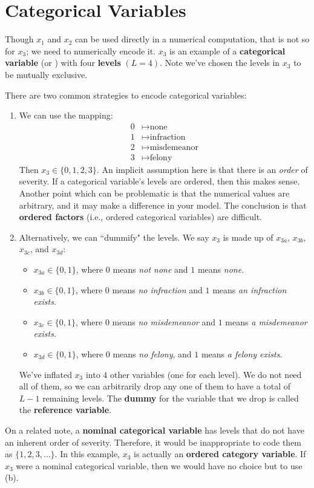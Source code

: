 \documentclass[12pt, a4paper]{article}
\begin{document}
	\section*{Categorical Variables}
	Though $x_1$ and $x_2$ can be used directly in a numerical computation, that is not so
	for $x_3$; we need to numerically encode it. $x_3$ is an example of a \textbf{categorical variable}
	(or ) with four \textbf{levels} $(L = 4)$. Note we've chosen the levels in $x_3$ to
	be mutually exclusive.
	
	There are two common strategies to encode categorical variables:
	\begin{enumerate}[label=(\alph*)]
		\item We can use the mapping:
		\begin{align*}
			0&\mapsto \text{none}\\
			1&\mapsto \text{infraction}\\
			2&\mapsto \text{misdemeanor}\\
			3&\mapsto \text{felony}
		\end{align*}
	Then $x_3\in\{0,1,2,3\}$. An implicit assumption here is that there is an \emph{order}
	of severity. If a categorical variable's levels are ordered, then this makes sense.
	Another point which can be problematic is that the numerical values are arbitrary, and
	it may make a difference in your model. The conclusion is that \textbf{ordered factors}
	(i.e., ordered categorical variables) are difficult.
	\item Alternatively, we can ``dummify" the levels. We say $x_3$ is made up of
	$x_{3a}$, $x_{3b}$, $x_{3c}$, and $x_{3d}$:
	\begin{itemize}
		\item $x_{3a}\in \{0, 1\}$, where $0$ means \textit{not none} and $1$ means \textit{none}.
		\item $x_{3b}\in \{0, 1\}$, where $0$ means \textit{no infraction} and $1$ means
		\textit{an infraction exists}.
		\item $x_{3c}\in \{0, 1\}$, where $0$ means \textit{no misdemeanor} and $1$ means
		\textit{a misdemeanor exists}.
		\item $x_{3d}\in \{0, 1\}$, where $0$ means \textit{no felony}, and $1$ means
		\textit{a felony exists}.
	\end{itemize}
	We've inflated $x_3$ into 4 other variables (one for each level). We do not need all of them,
	so we can arbitrarily drop any one of them to have a total of $L-1$ remaining levels.
	The \textbf{dummy} for the variable that we drop is called the \textbf{reference variable}.
	\end{enumerate}
	On a related note, a \textbf{nominal categorical variable} has levels that do not have an inherent
	order of severity. Therefore, it would be inappropriate to code them as $\{1,2,3,\ldots\}$.
	In this example, $x_3$ is actually an \textbf{ordered category variable}. If $x_3$ were a
	nominal categorical variable, then we would have no choice but to use (b).
	
\end{document}
